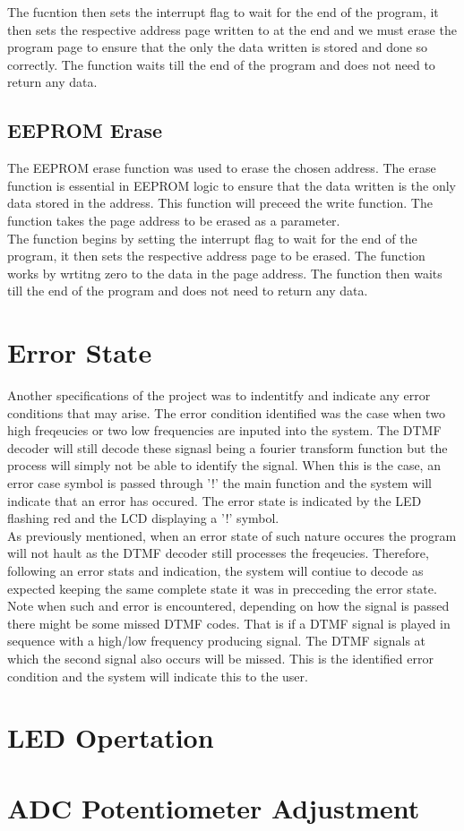 \documentclass{article}
\begin{document}
The fucntion then sets the interrupt flag to wait for the end of the program, it then sets the respective address page written to at the end and we must erase the program page to ensure that the only the data written is stored and done so correctly. The function waits till the end of the program and does not need to return any data. 

\subsection{EEPROM Erase}
The EEPROM erase function was used to erase the chosen address. The erase function is essential in EEPROM logic to ensure that the data written is the only data stored in the address. This function will preceed the write function. The function takes the page address to be erased as a parameter.\\

The function begins by setting the interrupt flag to wait for the end of the program, it then sets the respective address page to be erased. The function works by wrtitng zero to the data in the page address. The function then waits till the end of the program and does not need to return any data.

\pagebreak
\section{Error State}
Another specifications of the project was to indentitfy and indicate any error conditions that may arise. The error condition identified was the case when two high freqeucies or two low frequencies are inputed into the system. The DTMF decoder will still decode these signasl being a fourier transform function but the process will simply not be able to identify the signal. When this is the case, an error case symbol is passed through '!' the main function and the system will indicate that an error has occured. The error state is indicated by the LED flashing red and the LCD displaying a '!' symbol.\\

As previously mentioned, when an error state of such nature occures the program will not hault as the DTMF decoder still processes the freqeucies. Therefore, following an error stats and indication, the system will contiue to decode as expected keeping the same complete state it was in precceding the error state. Note when such and error is encountered, depending on how the signal is passed there might be some missed DTMF codes. That is if a DTMF signal is played in sequence with a high/low frequency producing signal. The DTMF signals at which the second signal also occurs will be missed. This is the identified error condition and the system will indicate this to the user.

\pagebreak
\section{LED Opertation}

\section{ADC Potentiometer Adjustment}
\end{document}
